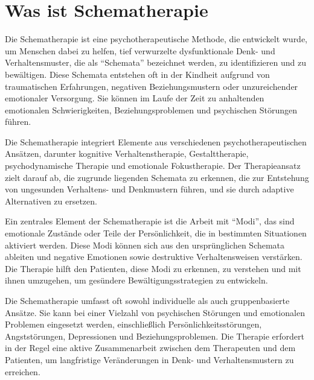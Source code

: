 \section{Was ist Schematherapie}
Die Schematherapie ist eine psychotherapeutische Methode, die entwickelt wurde, um Menschen dabei zu helfen, tief verwurzelte dysfunktionale Denk- und Verhaltensmuster, die als \enquote{Schemata} bezeichnet werden, zu identifizieren und zu bewältigen. Diese Schemata entstehen oft in der Kindheit aufgrund von traumatischen Erfahrungen, negativen Beziehungsmustern oder unzureichender emotionaler Versorgung. Sie können im Laufe der Zeit zu anhaltenden emotionalen Schwierigkeiten, Beziehungsproblemen und psychischen Störungen führen.

Die Schematherapie integriert Elemente aus verschiedenen psychotherapeutischen Ansätzen, darunter kognitive Verhaltenstherapie, Gestalttherapie, psychodynamische Therapie und emotionale Fokustherapie. Der Therapieansatz zielt darauf ab, die zugrunde liegenden Schemata zu erkennen, die zur Entstehung von ungesunden Verhaltens- und Denkmustern führen, und sie durch adaptive Alternativen zu ersetzen.

Ein zentrales Element der Schematherapie ist die Arbeit mit \enquote{Modi}, das sind emotionale Zustände oder Teile der Persönlichkeit, die in bestimmten Situationen aktiviert werden. Diese Modi können sich aus den ursprünglichen Schemata ableiten und negative Emotionen sowie destruktive Verhaltensweisen verstärken. Die Therapie hilft den Patienten, diese Modi zu erkennen, zu verstehen und mit ihnen umzugehen, um gesündere Bewältigungsstrategien zu entwickeln.

Die Schematherapie umfasst oft sowohl individuelle als auch gruppenbasierte Ansätze. Sie kann bei einer Vielzahl von psychischen Störungen und emotionalen Problemen eingesetzt werden, einschließlich Persönlichkeitsstörungen, Angststörungen, Depressionen und Beziehungsproblemen. Die Therapie erfordert in der Regel eine aktive Zusammenarbeit zwischen dem Therapeuten und dem Patienten, um langfristige Veränderungen in Denk- und Verhaltensmustern zu erreichen.
